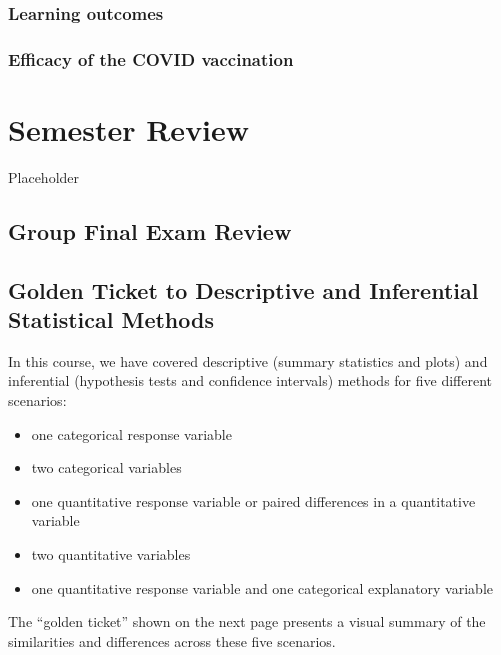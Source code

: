 \documentclass[
]{report}
\providecommand{\tightlist}{%
  \setlength{\itemsep}{0pt}\setlength{\parskip}{0pt}}
\begin{document}
\hypertarget{learning-outcomes-30}{%
\subsection{Learning outcomes}\label{learning-outcomes-30}}

\hypertarget{efficacy-of-the-covid-vaccination}{%
\subsection{Efficacy of the COVID vaccination}\label{efficacy-of-the-covid-vaccination}}

\hypertarget{semester-review}{%
\chapter{Semester Review}\label{semester-review}}

Placeholder

\hypertarget{group-final-exam-review}{%
\section{Group Final Exam Review}\label{group-final-exam-review}}

\hypertarget{golden-ticket-to-descriptive-and-inferential-statistical-methods}{%
\section{Golden Ticket to Descriptive and Inferential Statistical Methods}\label{golden-ticket-to-descriptive-and-inferential-statistical-methods}}

In this course, we have covered descriptive (summary statistics and plots) and inferential (hypothesis tests and confidence intervals) methods for five different scenarios:

\begin{itemize}
\tightlist
\item
  one categorical response variable
\item
  two categorical variables
\item
  one quantitative response variable or paired differences in a quantitative variable
\item
  two quantitative variables
\item
  one quantitative response variable and one categorical explanatory variable
\end{itemize}

The ``golden ticket'' shown on the next page presents a visual summary of the similarities and differences across these five scenarios.
\end{document}
